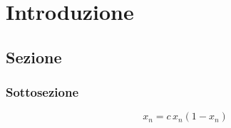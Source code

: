 \chapter{Introduzione}
\label{chapter1}

\section{Sezione}
    
    \subsection{Sottosezione}
    \begin{equation}
    	x_n = c \, x_n(1 - x_n)
    	\label{Ec:logis}
    \end{equation}
    

